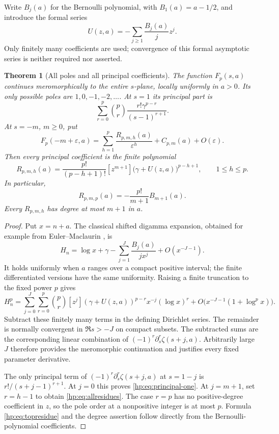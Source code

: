 \documentclass[11pt,a4paper]{article}
\numberwithin{equation}{section}
\newtheorem{theorem}{Theorem}[section]
\theoremstyle{definition}
\theoremstyle{remark}
\begin{document}
Write $B_j(a)$ for the Bernoulli polynomial, with $B_1(a)=a-1/2$, and
introduce the formal series
\begin{equation}\label{hp:def:U}
 U(z,a)=-\sum_{j\ge1}\frac{B_j(a)}jz^j.
\end{equation}
Only finitely many coefficients are used; convergence of this formal
asymptotic series is neither required nor asserted.

\begin{theorem}[All poles and all principal coefficients]\label{hp:thm:poles}
The function $F_p(s,a)$ continues meromorphically to the entire $s$-plane,
locally uniformly in $a>0$. Its only possible poles are
$1,0,-1,-2,\ldots$. At $s=1$ its principal part is
\begin{equation}\label{hp:eq:principal-one}
 \sum_{r=0}^p\binom pr\frac{r!\gamma^{p-r}}{(s-1)^{r+1}}.
\end{equation}
At $s=-m$, $m\ge0$, put
\[
 F_p(-m+\varepsilon,a)
 =\sum_{h=1}^p\frac{R_{p,m,h}(a)}{\varepsilon^h}
       +C_{p,m}(a)+O(\varepsilon).
\]
Then every principal coefficient is the finite polynomial
\begin{equation}\label{hp:eq:allresidues}
 \boxed{\quad
 R_{p,m,h}(a)=\frac{p!}{(p-h+1)!}
       [z^{m+1}]\bigl(\gamma+U(z,a)\bigr)^{p-h+1},
 \qquad 1\le h\le p.\quad}
\end{equation}
In particular,
\begin{equation}\label{hp:eq:topresidue}
 R_{p,m,p}(a)=-\frac{p!}{m+1}B_{m+1}(a).
\end{equation}
Every $R_{p,m,h}$ has degree at most $m+1$ in $a$.
\end{theorem}

\begin{proof}
Put $x=n+a$. The classical shifted digamma expansion, obtained for
example from Euler--Maclaurin \cite{hp:DLMF}, is
\begin{equation}\label{hp:eq:digamma-expansion}
 H_n=\log x+\gamma-
       \sum_{j=1}^{J}\frac{B_j(a)}{jx^j}+O(x^{-J-1}).
\end{equation}
It holds uniformly when $a$ ranges over a compact positive interval;
the finite differentiated versions have the same uniformity. Raising a
finite truncation to the fixed power $p$ gives
\[
 H_n^p=\sum_{j=0}^{J}\sum_{r=0}^p
  \binom pr[z^j](\gamma+U(z,a))^{p-r}
                    x^{-j}(\log x)^r
       +O\bigl(x^{-J-1}(1+\log^p x)\bigr).
\]
Subtract these finitely many terms in the defining Dirichlet series.
The remainder is normally convergent in $\Re s>-J$ on compact
subsets. The subtracted sums are the corresponding linear combination
of $(-1)^r\partial_s^r\zeta(s+j,a)$. Arbitrarily large $J$ therefore
provides the meromorphic continuation and justifies every fixed
parameter derivative.

The only principal term of
$(-1)^r\partial_s^r\zeta(s+j,a)$ at $s=1-j$ is
$r!/(s+j-1)^{r+1}$. At $j=0$ this proves
\eqref{hp:eq:principal-one}. At $j=m+1$, set $r=h-1$ to obtain
\eqref{hp:eq:allresidues}. The case $r=p$ has no positive-degree
coefficient in $z$, so the pole order at a nonpositive integer is at
most $p$. Formula \eqref{hp:eq:topresidue} and the degree assertion
follow directly from the Bernoulli-polynomial coefficients.
\end{proof}
\end{document}
